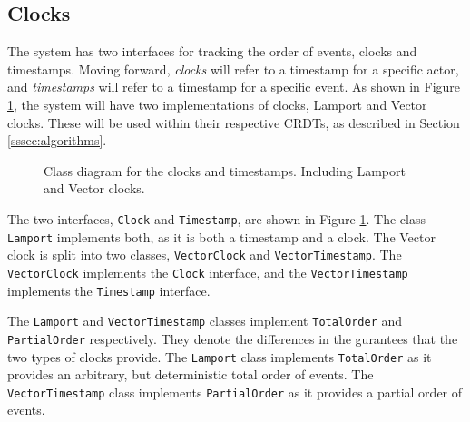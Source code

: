 \documentclass[12pt]{report}
\begin{document}
\subsection{Clocks}
The system has two interfaces for tracking the order of events, clocks and timestamps. Moving forward, \textit{clocks} will refer to a timestamp for a specific actor, and \textit{timestamps} will refer to a timestamp for a specific event.  
As shown in Figure \ref{fig:ordered}, the system will have two implementations of clocks, Lamport and Vector clocks. These will be used within their respective CRDTs, as described in Section \ref{sssec:algorithms}. \par

\begin{figure}[h]
    \centering
    \caption{Class diagram for the clocks and timestamps. Including Lamport and Vector clocks.}
    \label{fig:ordered}
\end{figure}  

The two interfaces, \texttt{Clock} and \texttt{Timestamp}, are shown in Figure \ref{fig:ordered}. The class \texttt{Lamport} implements both, as it is both a timestamp and a clock. The Vector clock is split into two classes, \texttt{VectorClock} and \texttt{VectorTimestamp}. The \texttt{VectorClock} implements the \texttt{Clock} interface, and the \texttt{VectorTimestamp} implements the \texttt{Timestamp} interface. \par

The \texttt{Lamport} and \texttt{VectorTimestamp} classes implement \texttt{TotalOrder} and \texttt{PartialOrder} respectively. They denote the differences in the gurantees that the two types of clocks provide. The \texttt{Lamport} class implements \texttt{TotalOrder} as it provides an arbitrary, but deterministic total order of events. The \texttt{VectorTimestamp} class implements \texttt{PartialOrder} as it provides a partial order of events. \par
\end{document}
